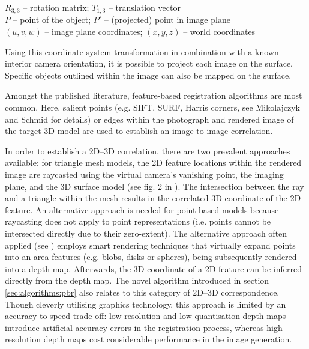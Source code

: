\documentclass[review]{elsarticle}
\begin{document}
\begin{center}
$R_{3,3}$ -- rotation matrix; $T_{1,3}$ -- translation vector \\$P$ -- point of the object; $P'$ -- (projected) point in image plane \\$(u,v,w)$ -- image plane coordinates; $(x,y,z)$ -- world coordinates
\end{center}


Using this coordinate system transformation in combination with a known interior camera orientation, it is possible to project each image on the surface. Specific objects outlined within the image can also be mapped on the surface.%

Amongst the published literature, feature-based registration algorithms are most common. Here, salient points (e.g. SIFT, SURF, Harris corners, see Mikolajczyk and Schmid \cite{MikolajczykXYZ} for details) or edges within the photograph and rendered image of the target 3D model are used to establish an image-to-image correlation. 

In order to establish a 2D--3D correlation, there are two prevalent approaches available: for triangle mesh models, the 2D feature locations within the rendered image are raycasted using the virtual camera's vanishing point, the imaging plane, and the 3D surface model (see fig. 2 in \cite{Kehl2016_ISPRS}). The intersection between the ray and a triangle within the mesh results in the correlated 3D coordinate of the 2D feature. An alternative approach is needed for point-based models because raycasting does not apply to point representations (i.e. points cannot be intersected directly due to their zero-extent). The alternative approach often applied (see \cite{Sibbing2013,Sattler2011,Rodriguez2012,Garcia2015}) employs smart rendering techniques that virtually expand points into an area features (e.g. blobs, disks or spheres), being subsequently rendered into a depth map. Afterwards, the 3D coordinate of a 2D feature can be inferred directly from the depth map. The novel algorithm introduced in section \ref{sec:algorithms:pbr} also relates to this category of 2D--3D correspondence. Though cleverly utilising graphics technology, this approach is limited by an accuracy-to-speed trade-off: low-resolution and low-quantisation depth maps introduce artificial accuracy errors in the registration process, whereas high-resolution depth maps cost considerable performance in the image generation.
\end{document}
